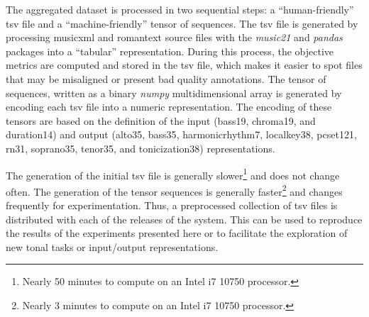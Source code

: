 
The aggregated dataset is processed in two sequential steps:
a ``human-friendly'' \gls{tsv} file and a
``machine-friendly'' tensor of sequences. The \gls{tsv} file
is generated by processing \gls{musicxml} and
\gls{romantext} source files with the \emph{music21}
\parencite{cuthbert2010music21} and \emph{pandas}
\parencite{mckinney2011pandas} packages into a ``tabular''
representation. During this process, the objective metrics
are computed and stored in the \gls{tsv} file, which makes
it easier to spot files that may be misaligned or present
bad quality annotations. The tensor of sequences, written as
a binary \emph{numpy} \parencite{oliphant2006guide}
multidimensional array is generated by encoding each
\gls{tsv} file into a numeric representation. The encoding
of these tensors are based on the definition of the input
(\gls{bass19}, \gls{chroma19}, and \gls{duration14}) and
output (\gls{alto35}, \gls{bass35}, \gls{harmonicrhythm7},
\gls{localkey38}, \gls{pcset121}, \gls{rn31},
\gls{soprano35}, \gls{tenor35}, and \gls{tonicization38})
representations.

The generation of the initial \gls{tsv} file is generally
slower\footnote{Nearly 50 minutes to compute on an Intel i7
10750 processor.} and does not change often. The generation
of the tensor sequences is generally faster\footnote{Nearly
3 minutes to compute on an Intel i7 10750 processor.} and
changes frequently for experimentation. Thus, a preprocessed
collection of \gls{tsv} files is distributed with each of
the releases of the system. This can be used to reproduce
the results of the experiments presented here or to
facilitate the exploration of new tonal tasks or
input/output representations.
